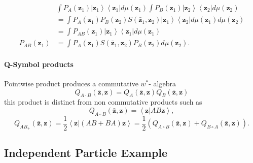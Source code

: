 \documentclass[aps,preprint]{revtex4}%
\begin{document}
\begin{align}
&  \int P_{A}\left(  \mathbf{z}_{1}\right)  \left\vert \mathbf{z}%
_{1}\right\rangle \left\langle \mathbf{z}_{1}\right\vert d\mu\left(
\mathbf{z}_{1}\right)  \int P_{B}\left(  \mathbf{z}_{1}\right)  \left\vert
\mathbf{z}_{2}\right\rangle \left\langle \mathbf{z}_{2}\right\vert d\mu\left(
\mathbf{z}_{2}\right)  \nonumber\\
&  =\int P_{A}\left(  \mathbf{z}_{1}\right)  P_{B}\left(  \mathbf{z}%
_{2}\right)  S\left(  \mathbf{\bar{z}}_{1},\mathbf{z}_{2}\right)  \left\vert
\mathbf{z}_{1}\right\rangle \left\langle \mathbf{z}_{2}\right\vert d\mu\left(
\mathbf{z}_{1}\right)  d\mu\left(  \mathbf{z}_{2}\right)  \nonumber\\
&  =\int P_{AB}\left(  \mathbf{z}_{1}\right)  \left\vert \mathbf{z}%
_{1}\right\rangle \left\langle \mathbf{z}_{1}\right\vert d\mu\left(
\mathbf{z}_{1}\right)  \nonumber\\
P_{AB}\left(  \mathbf{z}_{1}\right)   &  =\int P_{A}\left(  \mathbf{z}%
_{1}\right)  S\left(  \mathbf{\bar{z}}_{1},\mathbf{z}_{2}\right)  P_{B}\left(
\mathbf{z}_{2}\right)  d\mu\left(  \mathbf{z}_{2}\right)  .
\end{align}


\paragraph{Q-Symbol products}

Pointwise product produces a commutative $w^{\ast}$- algebra
\begin{equation}
Q_{A\cdot B}\left(  \mathbf{\bar{z}},\mathbf{z}\right)  =Q_{A}\left(
\mathbf{\bar{z}},\mathbf{z}\right)  Q_{B}\left(  \mathbf{\bar{z}}%
,\mathbf{z}\right)
\end{equation}
this product is distinct from non commutative products such as
\begin{equation}
Q_{A\circ B}\left(  \mathbf{\bar{z}},\mathbf{z}\right)  =\left\langle
\mathbf{z}\left\vert AB\mathbf{z}\right.  \right\rangle ,
\end{equation}%
\begin{equation}
Q_{AB_{+}}\left(  \mathbf{\bar{z}},\mathbf{z}\right)  =\frac{1}{2}\left\langle
\mathbf{z}\left\vert \left(  AB+BA\right)  \mathbf{z}\right.  \right\rangle
=\frac{1}{2}\left(  Q_{A\circ B}\left(  \mathbf{\bar{z}},\mathbf{z}\right)
+Q_{B\circ A}\left(  \mathbf{\bar{z}},\mathbf{z}\right)  \right)  .
\end{equation}


\subsection{Independent Particle Example}
\end{document}
